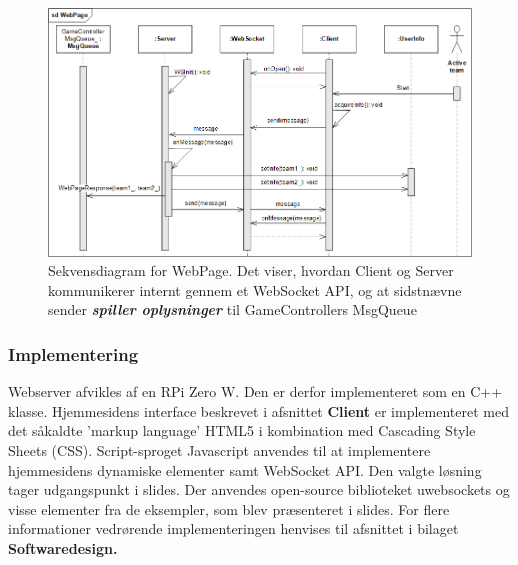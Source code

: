 \documentclass[Rapport/Rapport_main.tex]{subfiles}
\begin{document}
\begin{figure}[H]
    \centering
    \includegraphics[width=1\textwidth]{Softwaredesign/RPiApp/graphic_RPi/WebPage_sd_2.png}
    \caption{Sekvensdiagram for WebPage. Det viser, hvordan Client og Server kommunikerer internt gennem et WebSocket API, og at sidstnævne sender \textit{\textbf{spiller oplysninger}} til GameControllers MsgQueue}
    \label{fig:WebPage_sequence_diagram}
\end{figure}
\subsubsection{Implementering}
Webserver afvikles af en RPi Zero W. Den er derfor implementeret som en C++ klasse. Hjemmesidens interface beskrevet i afsnittet \textbf{Client} er implementeret med det såkaldte 'markup language' HTML5 i kombination med Cascading Style Sheets (CSS). Script-sproget Javascript anvendes til at implementere hjemmesidens dynamiske elementer samt WebSocket API. Den valgte løsning tager udgangspunkt i slides\cite{websockets_getting_started}. Der anvendes open-source biblioteket uwebsockets\cite{uwebsockets_repo} og visse elementer fra de eksempler, som blev præsenteret i slides. For flere informationer vedrørende implementeringen henvises til afsnittet  i bilaget \textbf{Softwaredesign.}
\end{document}
